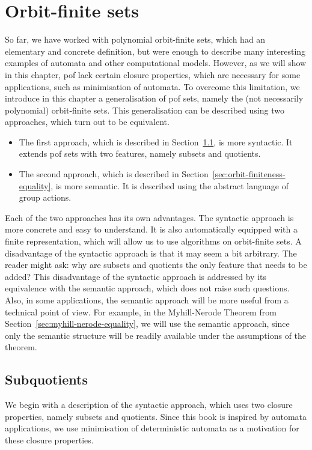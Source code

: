 \chapter{Orbit-finite sets}
\label{cha:orbit-finite-equality}

So far, we have worked with polynomial orbit-finite sets, which had an elementary and concrete definition, but were enough to describe many interesting examples of automata and other computational models. However, as we will show in this chapter,  pof lack certain closure properties, which are necessary for some applications, such as minimisation of automata. To overcome this limitation,  we introduce in this chapter a  generalisation of pof sets, namely the (not necessarily polynomial) orbit-finite sets.
This generalisation can be described using two approaches, which turn out to be equivalent.
\begin{itemize}
    \item The first approach, which is described in Section~\ref{sec:subquotiented-pof-sets}, is more syntactic. It  extends pof sets with two features, namely subsets and quotients.
    \item The second approach, which is described in Section~\ref{sec:orbit-finiteness-equality}, is more  semantic. It is described using the abstract language of group actions. 
\end{itemize}
Each of the two approaches has its own advantages. The syntactic approach is more concrete and easy to understand. It is also automatically equipped with a finite representation, which will allow us to use algorithms on orbit-finite sets. A disadvantage of the syntactic approach is that it may seem a bit arbitrary. The reader might ask: why are subsets and quotients the only feature that needs to be added? This disadvantage of the syntactic approach is addressed by its equivalence with the semantic approach, which does not raise such questions. Also, in some applications, the semantic approach will be more useful from a technical point of view. For example, in   the Myhill-Nerode Theorem from Section~\ref{sec:myhill-nerode-equality}, we will use the  semantic approach, since only the semantic structure will be readily available under the assumptions of the theorem.


\section{Subquotients}
\label{sec:subquotiented-pof-sets}
We begin with a description of the syntactic approach, which uses two closure properties, namely subsets and quotients. 
Since this book is inspired by automata applications, we  use minimisation of deterministic automata as a motivation for these closure properties.  

